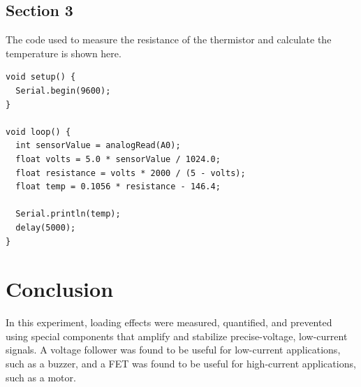 \documentclass[12pt]{article}
\begin{document}
\subsection*{Section 3}

The code used to measure the resistance of the thermistor and calculate the 
temperature is shown here.

\begin{verbatim}
void setup() {
  Serial.begin(9600);
}

void loop() {
  int sensorValue = analogRead(A0);
  float volts = 5.0 * sensorValue / 1024.0;
  float resistance = volts * 2000 / (5 - volts);
  float temp = 0.1056 * resistance - 146.4;

  Serial.println(temp);
  delay(5000); 
}

\end{verbatim}

\section*{Conclusion}

In this experiment, loading effects were measured, quantified, and prevented
using special components that amplify and stabilize precise-voltage, low-current 
signals. A voltage follower was found to be useful for low-current applications, 
such as a buzzer, and a FET was found to be useful for high-current applications,
such as a motor. 
\end{document}
